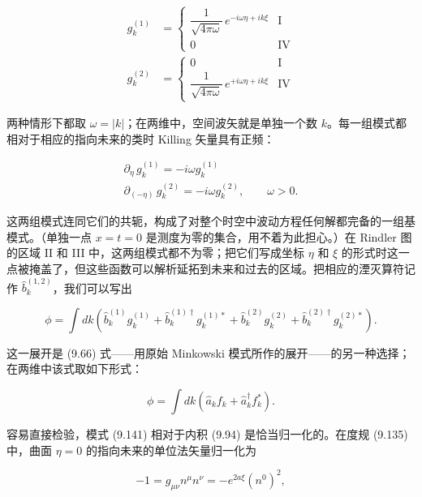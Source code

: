 \begin{equation*}
\begin{aligned}
g_{k}^{(1)} &= \begin{cases} \dfrac{1}{\sqrt{4\pi\omega}}\, e^{-i\omega\eta+ik\xi} & \mathrm{I} \\[10pt] 0 & \mathrm{IV} \end{cases} \\[14pt]
g_{k}^{(2)} &= \begin{cases} 0 & \mathrm{I} \\[10pt] \dfrac{1}{\sqrt{4\pi\omega}}\, e^{+i\omega\eta+ik\xi} & \mathrm{IV} \end{cases}
\end{aligned}
\tag{9.141}
\end{equation*}

两种情形下都取 $\omega=|k|$；在两维中，空间波矢就是单独一个数 $k$。每一组模式都相对于相应的指向未来的类时 Killing 矢量具有正频：

\begin{gather*}
\partial_{\eta}\, g_{k}^{(1)} = -i\omega g_{k}^{(1)} \\
\partial_{(-\eta)}\, g_{k}^{(2)} = -i\omega g_{k}^{(2)}, \qquad \omega > 0.
\tag{9.142}
\end{gather*}

这两组模式连同它们的共轭，构成了对整个时空中波动方程任何解都完备的一组基模式。（单独一点 $x=t=0$ 是测度为零的集合，用不着为此担心。）在 Rindler 图的区域 II 和 III 中，这两组模式都不为零；把它们写成坐标 $\eta$ 和 $\xi$ 的形式时这一点被掩盖了，但这些函数可以解析延拓到未来和过去的区域。把相应的湮灭算符记作 $\hat{b}_{k}^{(1,2)}$，我们可以写出

\begin{equation*}
\phi = \int dk\left(\hat{b}_{k}^{(1)}g_{k}^{(1)} + \hat{b}_{k}^{(1)\dagger}g_{k}^{(1)*} + \hat{b}_{k}^{(2)}g_{k}^{(2)} + \hat{b}_{k}^{(2)\dagger}g_{k}^{(2)*}\right).
\tag{9.143}
\end{equation*}

这一展开是 (9.66) 式——用原始 Minkowski 模式所作的展开——的另一种选择；在两维中该式取如下形式：

\begin{equation*}
\phi = \int dk\left(\hat{a}_{k}f_{k} + \hat{a}_{k}^{\dagger}f_{k}^{*}\right).
\tag{9.144}
\end{equation*}

容易直接检验，模式 (9.141) 相对于内积 (9.94) 是恰当归一化的。在度规 (9.135) 中，曲面 $\eta=0$ 的指向未来的单位法矢量归一化为

\begin{equation*}
-1 = g_{\mu\nu}n^{\mu}n^{\nu} = -e^{2a\xi}(n^{0})^{2},
\tag{9.145}
\end{equation*}

